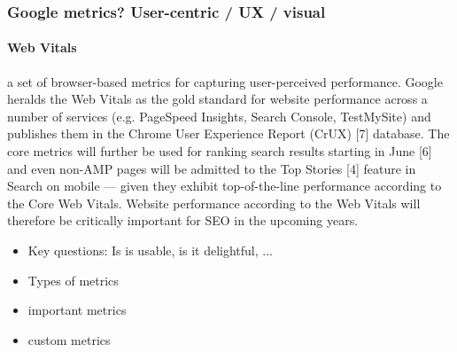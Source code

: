 












\subsubsection{Google metrics? User-centric / UX / visual}


\paragraph{Web Vitals}


a set of browser-based metrics for capturing user-perceived performance. Google heralds the Web Vitals as the gold standard for website performance across a number of services (e.g. PageSpeed Insights, Search Console, TestMySite) and publishes them in the Chrome User Experience Report (CrUX) [7] database. The core metrics will further be used for ranking search results starting in June [6] and even non-AMP pages will be admitted to the Top Stories [4] feature in Search on mobile — given they exhibit top-of-the-line performance according to the Core Web Vitals. Website performance according to the Web Vitals will therefore be critically important for SEO in the upcoming years.







\begin{itemize}
\item Key questions: Is is usable, is it delightful, ...
\item Types of metrics
\item important metrics
\item custom metrics
\end{itemize}


